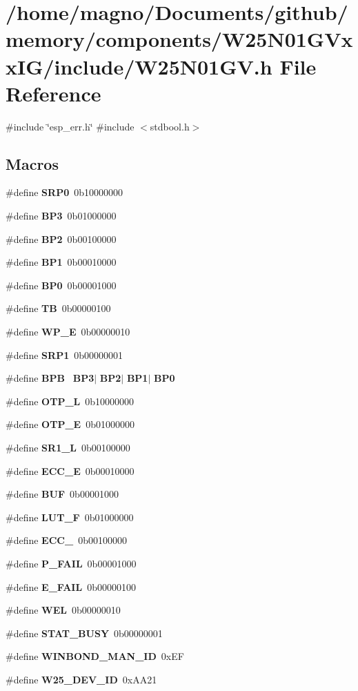 \section{/home/magno/\+Documents/github/memory/components/\+W25\+N01\+G\+Vxx\+I\+G/include/\+W25\+N01\+GV.h File Reference}
\label{_w25_n01_g_v_8h}
{\ttfamily \#include \char`\"{}esp\+\_\+err.\+h\char`\"{}}\newline
{\ttfamily \#include $<$stdbool.\+h$>$}\newline
\subsection*{Macros}
\begin{DoxyCompactItemize}
\item 
\#define \textbf{ S\+R\+P0}~0b10000000
\item 
\#define \textbf{ B\+P3}~0b01000000
\item 
\#define \textbf{ B\+P2}~0b00100000
\item 
\#define \textbf{ B\+P1}~0b00010000
\item 
\#define \textbf{ B\+P0}~0b00001000
\item 
\#define \textbf{ TB}~0b00000100
\item 
\#define \textbf{ W\+P\+\_\+E}~0b00000010
\item 
\#define \textbf{ S\+R\+P1}~0b00000001
\item 
\#define \textbf{ B\+PB}~\textbf{ B\+P3}$\vert$\textbf{ B\+P2}$\vert$\textbf{ B\+P1}$\vert$\textbf{ B\+P0}
\item 
\#define \textbf{ O\+T\+P\+\_\+L}~0b10000000
\item 
\#define \textbf{ O\+T\+P\+\_\+E}~0b01000000
\item 
\#define \textbf{ S\+R1\+\_\+L}~0b00100000
\item 
\#define \textbf{ E\+C\+C\+\_\+E}~0b00010000
\item 
\#define \textbf{ B\+UF}~0b00001000
\item 
\#define \textbf{ L\+U\+T\+\_\+F}~0b01000000
\item 
\#define \textbf{ E\+C\+C\+\_}~0b00100000
\item 
\#define \textbf{ P\+\_\+\+F\+A\+IL}~0b00001000
\item 
\#define \textbf{ E\+\_\+\+F\+A\+IL}~0b00000100
\item 
\#define \textbf{ W\+EL}~0b00000010
\item 
\#define \textbf{ S\+T\+A\+T\+\_\+\+B\+U\+SY}~0b00000001
\item 
\#define \textbf{ W\+I\+N\+B\+O\+N\+D\+\_\+\+M\+A\+N\+\_\+\+ID}~0x\+EF
\item 
\#define \textbf{ W25\+\_\+\+D\+E\+V\+\_\+\+ID}~0x\+A\+A21
\end{DoxyCompactItemize}
